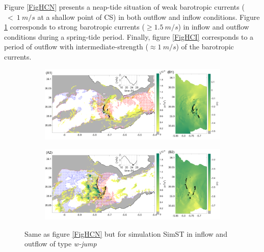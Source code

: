 Figure \ref{FigHCN} presents a neap-tide situation of weak barotropic currents ($\ <\ 1\ m/s$ at a shallow point of CS) in both outflow and inflow conditions. Figure \ref{FigHCS} corresponds to strong barotropic currents ($\geq 1.5\ m/s$) in inflow and outflow conditions during a spring-tide period. Finally, figure \ref{FigHCI} corresponds to a period of outflow with intermediate-strength ($\approx 1\ m/s$) of the barotropic currents.

\begin{figure}[!h]
 \centering
\begin{subfigure}{\linewidth}
\centering
\includegraphics[width=\linewidth]{./GBR3D/VE2_19h30_p.png}
\end{subfigure}

\begin{subfigure}{\linewidth}
\centering
\includegraphics[width=\linewidth]{./GBR3D/VE2_25h_p.png}
\end{subfigure}
\caption [Supercritical flow, location of hydraulic jump, standard deviation of parameter $Q$ in SimST.]{Same as figure \ref{FigHCN} but for simulation SimST in inflow and outflow of type \textit{w-jump}}
\label{FigHCS}
\end{figure}

